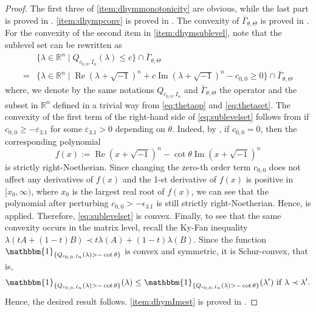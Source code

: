 \documentclass[10pt,a4paper]{amsart}
\numberwithin{equation}{section}
\begin{document}
\begin{proof}
    The first three of \ref{item:dhymmonotonicity} are obvious, while the last part is proved in \cite[Lemma 5.6 (3)]{GChen}. \ref{item:dhympconv} is proved in \cite[Proposition 2.2]{CLT}. The convexity of $\bar{\Gamma}_{\theta,\Theta}$ is proved in \cite[Lemma 5.6 (10)]{GChen}. For the convexity of the second item in \ref{item:dhymsublevel}, 
    note that the sublevel set can be rewritten as
    \begin{equation}\label{eq:sublevelset}
        \begin{aligned}
            &\{\lambda\in\mathbb{R}^n\mid Q_{c_{0,0},I_n}(\lambda)\le c\}\cap\bar{\Gamma}_{\theta,\Theta}\\
        =&\{\lambda\in\mathbb{R}^n\mid \operatorname{Re}(\lambda+\sqrt{-1})^n+c\operatorname{Im}(\lambda+\sqrt{-1})^n-c_{0,0}\ge0\}\cap\bar{\Gamma}_{\theta,\Theta}
        \end{aligned}
    \end{equation}
    where, we denote by the same notations $Q_{c_{0,0},I_n}$ and $\bar{\Gamma}_{\theta,\Theta}$ the operator and the subset in $\mathbb{R}^n$ defined in a trivial way from \eqref{eq:thetaop} and \eqref{eq:thetaset}. The convexity of the first term of the right-hand side of \eqref{eq:sublevelset} follows from \cite[Theorem 1.1]{Lina} if $c_{0,0}\ge-\varepsilon_{3.1}$ for some $\varepsilon_{3.1}>0$ depending on $\theta$. Indeed, by \cite[Lemma 4.2]{Lina}, if $c_{0,0}=0$, then the corresponding polynomial
    $$f(x):=\operatorname{Re}(x+\sqrt{-1})^n-\cot\theta\operatorname{Im}(x+\sqrt{-1})^n$$
    is strictly right-Noetherian. Since changing the zero-th order term $c_{0,0}$ does not affect any derivatives of $f(x)$ and the 1-st derivative of $f(x)$ is positive in $[x_0,\infty)$, where $x_0$ is the largest real root of $f(x)$, we can see that the polynomial after perturbing $c_{0,0}>-\epsilon_{3.1}$ is still strictly right-Noetherian. Hence, \cite[Theorem 1.1]{Lina} is applied. Therefore, \eqref{eq:sublevelset} is convex.
    Finally, to see that the same convexity occurs in the matrix level, recall the Ky-Fan inequality 
    $\lambda(tA+(1-t)B)\prec t\lambda(A)+(1-t)\lambda(B)$.
    Since the function $\mathbbm{1}_{\{Q_{c_{0,0},I_n}(\lambda)>-\cot\theta\}}$ is convex and symmetric, it is Schur-convex, that is, 
    $$\mathbbm{1}_{\{Q_{c_{0,0},I_n}(\lambda)>-\cot\theta\}}(\lambda)\le\mathbbm{1}_{\{Q_{c_{0,0},I_n}(\lambda)>-\cot\theta\}}(\lambda') \text{ if }\lambda\prec\lambda'.$$
    Hence, the desired result follows. 
    \ref{item:dhymImest} is proved in \cite[Lemma 5.6 (1)]{GChen}.
\end{proof}
\end{document}
